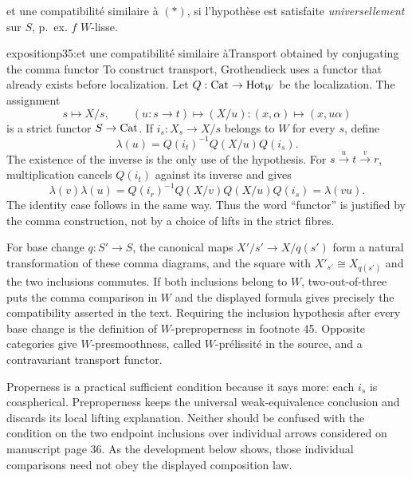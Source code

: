 \leavevmode{}et une compatibilité similaire à $(*)$, si l'hypothèse est satisfaite \textit{universellement} sur $S$, p.~ex. $f$ $W$-lisse.

\begin{dcomment}{exposition}{p35:et une compatibilité similaire à}{Transport obtained by conjugating the comma functor}
To construct transport, Grothendieck uses a functor that already exists before localization. Let $Q:\mathrm{Cat}\to\mathrm{Hot}_W$ be the localization. The assignment
\[
 s\longmapsto X/s,\qquad
 (u:s\to t)\longmapsto(X/u):(x,\alpha)\longmapsto(x,u\alpha)
\]
is a strict functor $S\to\mathrm{Cat}$. If $i_s:X_s\to X/s$ belongs to $W$ for every $s$, define
\[
 \lambda(u)=Q(i_t)^{-1}Q(X/u)Q(i_s).
\]
The existence of the inverse is the only use of the hypothesis. For $s\xrightarrow u t\xrightarrow v r$, multiplication cancels $Q(i_t)$ against its inverse and gives
\[
 \lambda(v)\lambda(u)
 =Q(i_r)^{-1}Q(X/v)Q(X/u)Q(i_s)
 =\lambda(vu).
\]
The identity case follows in the same way. Thus the word ``functor'' is justified by the comma construction, not by a choice of lifts in the strict fibres.

For base change $q:S'\to S$, the canonical maps $X'/s'\to X/q(s')$ form a natural transformation of these comma diagrams, and the square with $X'_{s'}\cong X_{q(s')}$ and the two inclusions commutes. If both inclusions belong to $W$, two-out-of-three puts the comma comparison in $W$ and the displayed formula gives precisely the compatibility asserted in the text. Requiring the inclusion hypothesis after every base change is the definition of $W$-preproperness in footnote 45. Opposite categories give $W$-presmoothness, called $W$-prélissité in the source, and a contravariant transport functor.

Properness is a practical sufficient condition because it says more: each $i_s$ is coaspherical. Preproperness keeps the universal weak-equivalence conclusion and discards its local lifting explanation. Neither should be confused with the condition on the two endpoint inclusions over individual arrows considered on manuscript page 36. As the development below shows, those individual comparisons need not obey the displayed composition law.
\end{dcomment}


